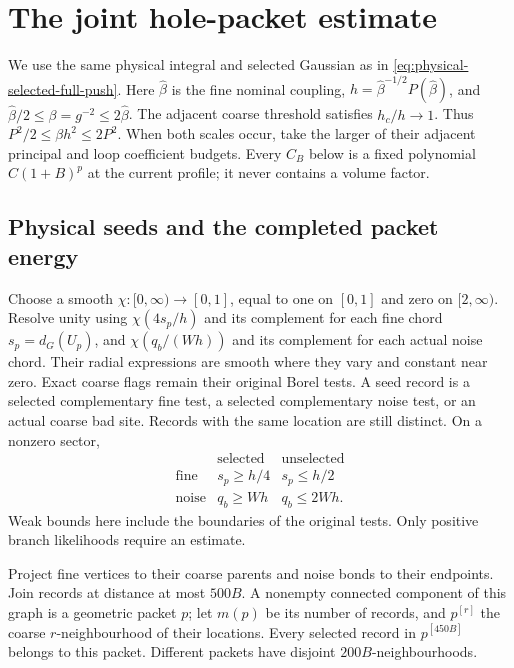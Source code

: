 \documentclass[11pt,reqno]{amsart}
\numberwithin{equation}{section}
\theoremstyle{definition}
\theoremstyle{remark}
\begin{document}
\section{The joint hole-packet estimate}
\label{sec:joint-hole-packets}

We use the same physical integral and selected Gaussian as in
\eqref{eq:physical-selected-full-push}. Here \(\widehat\beta\)
is the fine nominal coupling,
\(h=\widehat\beta^{-1/2}P(\widehat\beta)\), and
\(\widehat\beta/2\le\beta=g^{-2}\le2\widehat\beta\).
The adjacent coarse threshold satisfies \(h_c/h\to1\).
Thus \(P^2/2\le\beta h^2\le2P^2\).
When both scales occur, take the larger of their adjacent
principal and loop coefficient budgets.
Every \(C_B\) below is a fixed polynomial \(C(1+B)^p\)
at the current profile; it never contains a volume factor.

\subsection{Physical seeds and the completed packet energy}

Choose a smooth \(\chi:[0,\infty)\to[0,1]\), equal to one
on \([0,1]\) and zero on \([2,\infty)\). Resolve unity using
\(\chi(4s_p/h)\) and its complement for each fine chord
\(s_p=d_G(U_p)\), and \(\chi(q_b/(Wh))\) and its complement
for each actual noise chord. Their radial expressions are smooth
where they vary and constant near zero. Exact coarse flags
remain their original Borel tests.
A seed record is a selected complementary fine test, a selected
complementary noise test, or an actual coarse bad site. Records
with the same location are still distinct. On a nonzero sector,
\begin{equation}
 \begin{array}{c|cc}
       &\text{selected}&\text{unselected}\\ \hline
 \text{fine}&s_p\ge h/4&s_p\le h/2\\
 \text{noise}&q_b\ge Wh&q_b\le2Wh.
 \end{array}
 \label{eq:packet-seed-tests}
\end{equation}
Weak bounds here include the boundaries of the original tests.
Only positive branch likelihoods require an estimate.

Project fine vertices to their coarse parents and noise bonds
to their endpoints. Join records at distance at most \(500B\).
A nonempty connected component of this graph is a geometric
packet \(p\); let \(m(p)\) be its number of records, and
\(p^{[r]}\) the coarse \(r\)-neighbourhood of their locations.
Every selected record in \(p^{[450B]}\) belongs to this packet.
Different packets have disjoint \(200B\)-neighbourhoods.
\end{document}
